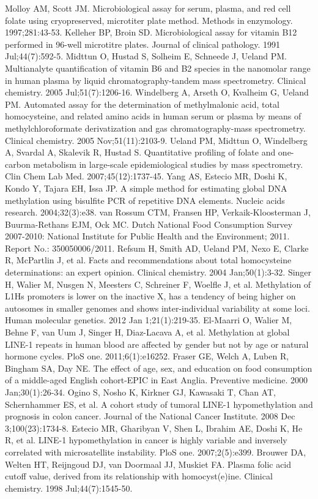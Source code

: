 \begin{thebibliography}{12}
		Molloy AM, Scott JM. Microbiological assay for serum, plasma, and red cell folate using cryopreserved, microtiter plate method. Methods in enzymology. 1997;281:43-53. 
		Kelleher BP, Broin SD. Microbiological assay for vitamin B12 performed in 96-well microtitre plates. Journal of clinical pathology. 1991 Jul;44(7):592-5. 
		Midttun O, Hustad S, Solheim E, Schneede J, Ueland PM. Multianalyte quantification of vitamin B6 and B2 species in the nanomolar range in human plasma by liquid chromatography-tandem mass spectrometry. Clinical chemistry. 2005 Jul;51(7):1206-16. 
		Windelberg A, Arseth O, Kvalheim G, Ueland PM. Automated assay for the determination of methylmalonic acid, total homocysteine, and related amino acids in human serum or plasma by means of methylchloroformate derivatization and gas chromatography-mass spectrometry. Clinical chemistry. 2005 Nov;51(11):2103-9. 
		Ueland PM, Midttun O, Windelberg A, Svardal A, Skalevik R, Hustad S. Quantitative profiling of folate and one-carbon metabolism in large-scale epidemiological studies by mass spectrometry. Clin Chem Lab Med. 2007;45(12):1737-45. 
		Yang AS, Estecio MR, Doshi K, Kondo Y, Tajara EH, Issa JP. A simple method for estimating global DNA methylation using bisulfite PCR of repetitive DNA elements. Nucleic acids research. 2004;32(3):e38. 
		van Rossum CTM, Fransen HP, Verkaik-Kloosterman J, Buurma-Rethans EJM, Ock MC. Dutch National Food Consumption Survey 2007-2010: National Institute for Public Health and the Environment; 2011. Report No.: 350050006/2011. 
		Refsum H, Smith AD, Ueland PM, Nexo E, Clarke R, McPartlin J, et al. Facts and recommendations about total homocysteine determinations: an expert opinion. Clinical chemistry. 2004 Jan;50(1):3-32. 
		Singer H, Walier M, Nusgen N, Meesters C, Schreiner F, Woelfle J, et al. Methylation of L1Hs promoters is lower on the inactive X, has a tendency of being higher on autosomes in smaller genomes and shows inter-individual variability at some loci. Human molecular genetics. 2012 Jan 1;21(1):219-35. 
		El-Maarri O, Walier M, Behne F, van Uum J, Singer H, Diaz-Lacava A, et al. Methylation at global LINE-1 repeats in human blood are affected by gender but not by age or natural hormone cycles. PloS one. 2011;6(1):e16252. 
		Fraser GE, Welch A, Luben R, Bingham SA, Day NE. The effect of age, sex, and education on food consumption of a middle-aged English cohort-EPIC in East Anglia. Preventive medicine. 2000 Jan;30(1):26-34. 
		Ogino S, Nosho K, Kirkner GJ, Kawasaki T, Chan AT, Schernhammer ES, et al. A cohort study of tumoral LINE-1 hypomethylation and prognosis in colon cancer. Journal of the National Cancer Institute. 2008 Dec 3;100(23):1734-8. 
		Estecio MR, Gharibyan V, Shen L, Ibrahim AE, Doshi K, He R, et al. LINE-1 hypomethylation in cancer is highly variable and inversely correlated with microsatellite instability. PloS one. 2007;2(5):e399. 
		Brouwer DA, Welten HT, Reijngoud DJ, van Doormaal JJ, Muskiet FA. Plasma folic acid cutoff value, derived from its relationship with homocyst(e)ine. Clinical chemistry. 1998 Jul;44(7):1545-50. 
\end{thebibliography} 
